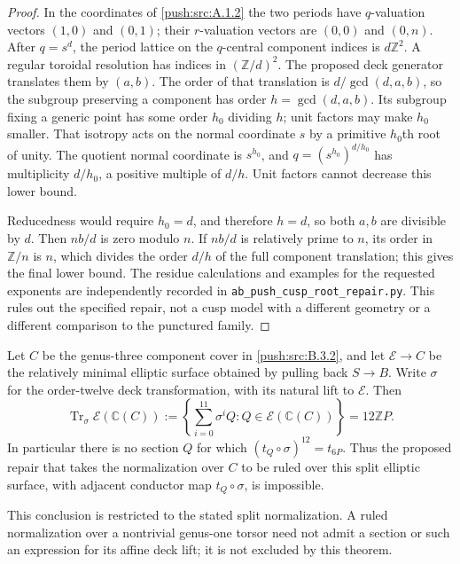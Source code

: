 \begin{proof}
In the coordinates of \ref{push:src:A.1.2} the two
periods have $q$-valuation vectors
$(1,0)$ and $(0,1)$; their $r$-valuation
vectors are $(0,0)$ and $(0,n)$.
After $q=s^d$, the period lattice on
the $q$-central component indices is
$d\mathbb Z^2$. A regular toroidal
resolution has indices in
$(\mathbb Z/d)^2$. The proposed deck
generator translates them by $(a,b)$.
The order of that translation is
$d/\gcd(d,a,b)$, so the subgroup
preserving a component has order
$h=\gcd(d,a,b)$. Its subgroup fixing
a generic point has some order
$h_0$ dividing $h$; unit factors may
make $h_0$ smaller. That isotropy
acts on the normal coordinate $s$
by a primitive $h_0$th root of
unity. The quotient normal
coordinate is $s^{h_0}$, and
$q=(s^{h_0})^{d/h_0}$ has
multiplicity $d/h_0$, a positive
multiple of $d/h$. Unit factors
cannot decrease this lower bound.

Reducedness would require $h_0=d$,
and therefore $h=d$,
so both $a,b$ are divisible by $d$.
Then $nb/d$ is zero modulo $n$.
If $nb/d$ is relatively prime to
$n$, its order in $\mathbb Z/n$
is $n$, which divides the order
$d/h$ of the full component
translation; this gives the final
lower bound. The residue calculations
and examples for the requested
exponents are independently recorded
in \texttt{ab\_push\_cusp\_root\_repair.py}.
This rules out the specified repair,
not a cusp model with a different
geometry or a different comparison
to the punctured family.
\end{proof}

\begin{theorem}\label{push:src:B.3.4}\label{push:B34}
Let $C$ be the genus-three component cover
in \ref{push:src:B.3.2}, and let $\mathscr E\to C$ be
the relatively minimal elliptic surface
obtained by pulling back $S\to B$.
Write $\sigma$ for the order-twelve deck
transformation, with its natural lift to
$\mathscr E$. Then
\[
 \operatorname{Tr}_{\sigma}
   \mathscr E(\mathbb C(C))
 :=\left\{\sum_{i=0}^{11}\sigma^i Q:
                 Q\in\mathscr E(\mathbb C(C))\right\}
 =12\mathbb Z P.
\]
In particular there is no section $Q$
for which $(t_Q\circ\sigma)^{12}=t_{6P}$.
Thus the proposed repair that takes the
normalization over $C$ to be ruled over
this split elliptic surface, with adjacent
conductor map $t_Q\circ\sigma$, is
impossible.

This conclusion is restricted to the
stated split normalization. A ruled
normalization over a nontrivial genus-one
torsor need not admit a section or such
an expression for its affine deck lift;
it is not excluded by this theorem.
\end{theorem}

